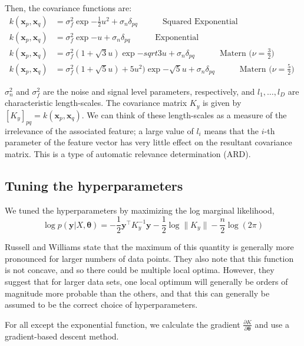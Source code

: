 \documentclass{article} %
\def\bfx{\mathbf x}
\def\bfy{\mathbf y}
\def\bftheta{\mathbf \theta}
\begin{document}
Then, the covariance functions are:
\begin{align}
	k(\bfx_p, \bfx_q) &= \sigma_f^2 \exp{- \frac{1}{2} u^2} + \sigma_n \delta_{pq} \quad \quad \quad \mbox{Squared Exponential}   \\
	k(\bfx_p, \bfx_q) &= \sigma_f^2 \exp{- u} + \sigma_n \delta_{pq} \quad \quad \quad \mbox{Exponential}   \\
	k(\bfx_p, \bfx_q) &= \sigma_f^2 \left( 1 + \sqrt{3} u \right) \exp{- sqrt{3}  u} + \sigma_n \delta_{pq} \quad \quad \quad \mbox{Matern ($\nu = \frac{3}{2}$) }   \\
	k(\bfx_p, \bfx_q) &= \sigma_f^2 \left( 1 + \sqrt{5} u \right) + 5 u^2) \exp{- \sqrt{5} u} + \sigma_n \delta_{pq} \quad \quad \quad \mbox{Matern ($\nu = \frac{5}{2}$) }
\end{align}

$\sigma_n^2$ and $\sigma_f^2$ are the noise and signal level parameters, respectively, and $l_1, \dots, l_D$ are characteristic length-scales.
The covariance matrix $K_y$ is given by $[K_y]_{pq} = k(\bfx_p, \bfx_q)$.
We can think of these length-scales as a measure of the irrelevance of the associated feature; a large value of $l_i$ means that the $i$-th parameter of the feature vector has very little effect on the resultant covariance matrix.
This is a type of automatic relevance determination (ARD).


\subsection{Tuning the hyperparameters}
We tuned the hyperparameters by maximizing the log marginal likelihood, 
\begin{equation}
	\log p(\bfy | X, \bftheta) = - \frac{1}{2} \bfy^\top K_y^{-1} \bfy - \frac{1}{2} \log \| K_y \| - \frac{n}{2} \log (2 \pi)
\end{equation}

Russell and Williams state that the maximum of this quantity is generally more pronounced for larger numbers of data points.
They also note that this function is not concave, and so there could be multiple local optima.
However, they suggest that for larger data sets, one local optimum will generally be orders of magnitude more probable than the others, and that this can generally be assumed to be the correct choice of hyperparameters.

For all except the exponential function, we calculate the gradient $\frac{\partial K} {\partial \bftheta}$ and use a gradient-based descent method.
\end{document}
